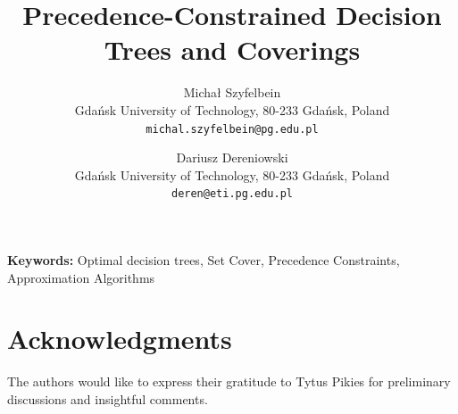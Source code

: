 \documentclass[11pt]{article}
\title{Precedence-Constrained Decision Trees and Coverings}
\author{%
Michał Szyfelbein\\
Gdańsk University of Technology, 80-233 Gdańsk, Poland\\
\texttt{michal.szyfelbein@pg.edu.pl}
\and
Dariusz Dereniowski\\
Gdańsk University of Technology, 80-233 Gdańsk, Poland\\
\texttt{deren@eti.pg.edu.pl}
}
\date{}
\theoremstyle{definition}
\theoremstyle{plain}
\theoremstyle{remark}
\begin{document}
\maketitle



\noindent\textbf{Keywords:} Optimal decision trees, Set Cover, Precedence Constraints, Approximation Algorithms



% 





\section*{Acknowledgments}
The authors would like to express their gratitude to Tytus Pikies for preliminary discussions and insightful comments.





\end{document}
